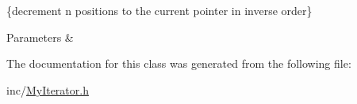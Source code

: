 \{decrement n positions to the current pointer in inverse order\} 


\begin{DoxyParams}{Parameters}
{\em } & \\
\hline
\end{DoxyParams}


The documentation for this class was generated from the following file\+:\begin{DoxyCompactItemize}
\item 
inc/\hyperlink{MyIterator_8h}{My\+Iterator.\+h}\end{DoxyCompactItemize}
